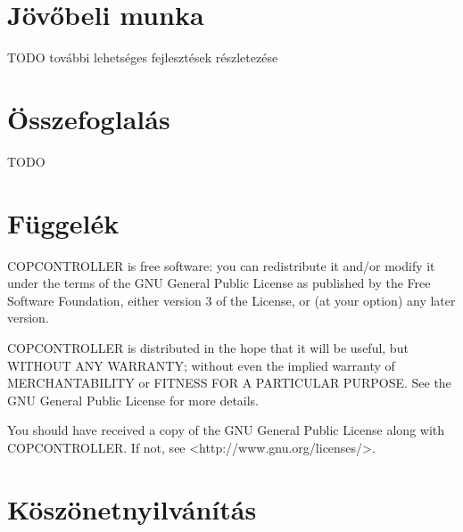 \documentclass[a4paper,12pt]{report}
\begin{document}
\newpage
\chapter{Jövőbeli munka}
\label{futureworks}

TODO további lehetséges fejlesztések részletezése

\newpage
\chapter{Összefoglalás}
\label{summary}

TODO

\newpage
{}

\begin{singlespace}

\end{singlespace}

\chapter*{Függelék}

\noindent
COPCONTROLLER is free software: you can redistribute it and/or modify
it under the terms of the GNU General Public License as published by
the Free Software Foundation, either version 3 of the License, or
(at your option) any later version.

\noindent
COPCONTROLLER is distributed in the hope that it will be useful,
but WITHOUT ANY WARRANTY; without even the implied warranty of
MERCHANTABILITY or FITNESS FOR A PARTICULAR PURPOSE.  See the
GNU General Public License for more details.

\noindent
You should have received a copy of the GNU General Public License
along with COPCONTROLLER. If not, see <http://www.gnu.org/licenses/>.



\chapter*{Köszönetnyilvánítás}
\end{document}
